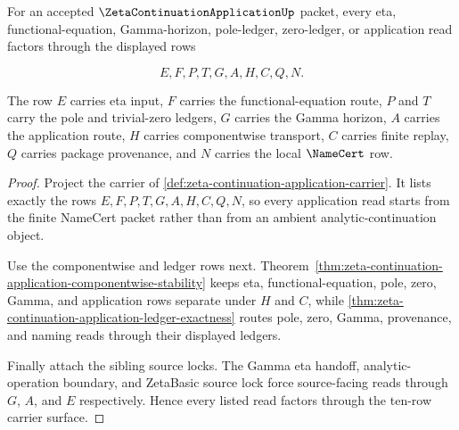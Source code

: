 \begin{theorem}
\label{thm:zeta-continuation-application-route-totality}
For an accepted $\ZetaContinuationApplicationUp$ packet, every eta, functional-equation, Gamma-horizon, pole-ledger, zero-ledger, or application read factors through the displayed rows

$$
E,F,P,T,G,A,H,C,Q,N.
$$

The row $E$ carries eta input, $F$ carries the functional-equation route, $P$ and $T$ carry the pole and trivial-zero ledgers, $G$ carries the Gamma horizon, $A$ carries the application route, $H$ carries componentwise transport, $C$ carries finite replay, $Q$ carries package provenance, and $N$ carries the local $\NameCert$ row.
\end{theorem}
\begin{proof}
Project the carrier of \autoref{def:zeta-continuation-application-carrier}. It lists exactly the rows $E,F,P,T,G,A,H,C,Q,N$, so every application read starts from the finite NameCert packet rather than from an ambient analytic-continuation object.

Use the componentwise and ledger rows next. Theorem~\ref{thm:zeta-continuation-application-componentwise-stability} keeps eta, functional-equation, pole, zero, Gamma, and application rows separate under $H$ and $C$, while \autoref{thm:zeta-continuation-application-ledger-exactness} routes pole, zero, Gamma, provenance, and naming reads through their displayed ledgers.

Finally attach the sibling source locks. The Gamma eta handoff, analytic-operation boundary, and ZetaBasic source lock force source-facing reads through $G$, $A$, and $E$ respectively. Hence every listed read factors through the ten-row carrier surface.
\end{proof}

